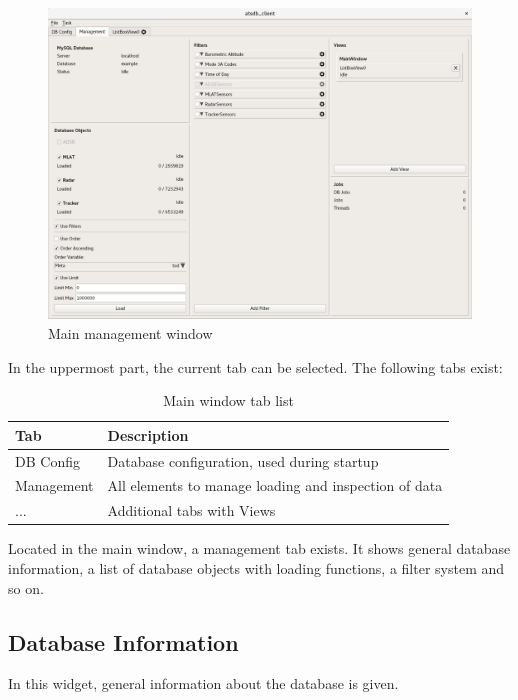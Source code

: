 \documentclass[10pt,letterpaper,extrafontsizes]{memoir}
\begin{document}
\begin{figure}[H]
  \hspace*{-2cm}
    \includegraphics[width=18cm,frame]{../screenshots/management.png}
  \caption{Main management window}
  \label{fig:management}
\end{figure}

In the uppermost part, the current tab can be selected. The following tabs exist:

\begin{table}[h]
  \center
  \begin{tabular}{ | l | l |}
    \hline
    \textbf{Tab} & \textbf{Description} \\ \hline
    DB Config & Database configuration, used during startup \\ \hline
    Management & All elements to manage loading and inspection of data \\ \hline
    ... & Additional tabs with Views \\
    \hline
  \end{tabular}
  \caption{Main window tab list}
\end{table}

Located in the main window, a management tab exists.  It shows general database information, a list of database objects with loading functions, a filter system and so on.

\subsection{Database Information}

In this widget, general information about the database is given. 
\end{document}
